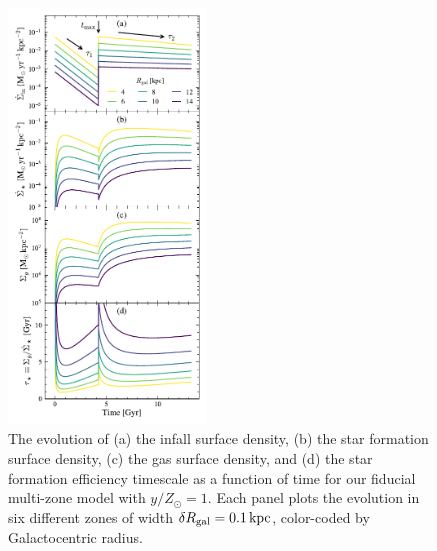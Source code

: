 \documentclass[twocolumn,twocolappendix,linenumbers]{aastex631}
\newcommand{\kpc}{\,{\rm kpc}}
\newcommand{\onecolumn}{0.47\textwidth}
\begin{document}
\begin{figure}
    \centering
    \includegraphics[width=\onecolumn]{figures/star_formation_history.pdf}
    \caption{The evolution of (a) the infall surface density, (b) the star formation surface density, (c) the gas surface density, and (d) the star formation efficiency timescale as a function of time for our fiducial multi-zone model with $y/Z_\odot=1$. Each panel plots the evolution in six different zones of width $\delta R_{\rm gal}=0.1\kpc$, color-coded by Galactocentric radius.}
    \label{fig:sfh}
\end{figure}
\end{document}
